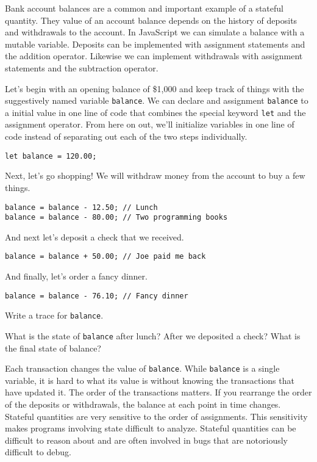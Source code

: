 Bank account balances are a common and important example of a stateful quantity. They value of an account balance depends on the history of deposits and withdrawals to the account. In JavaScript we can simulate a balance with a mutable variable. Deposits can be implemented with assignment statements and the addition operator. Likewise we can implement withdrawals with assignment statements and the subtraction operator.

Let's begin with an opening balance of \$1,000 and keep track of things with the suggestively named variable \texttt{balance}. We can declare and assignment \texttt{balance} to a initial value in one line of code that combines the special keyword \texttt{let} and the assignment operator. From here on out, we'll initialize variables in one line of code instead of separating out each of the two steps individually.

\begin{lstlisting}
let balance = 120.00;
\end{lstlisting}

Next, let's go shopping! We will withdraw money from the account to buy a few things.

\begin{lstlisting}
balance = balance - 12.50; // Lunch
balance = balance - 80.00; // Two programming books
\end{lstlisting}

And next let's deposit a check that we received.

\begin{lstlisting}
balance = balance + 50.00; // Joe paid me back
\end{lstlisting}

And finally, let's order a fancy dinner.

\begin{lstlisting}
balance = balance - 76.10; // Fancy dinner
\end{lstlisting}

\begin{question}
  Write a trace for \texttt{balance}.
\end{question}


\begin{question}
  What is the state of \texttt{balance} after lunch? After we deposited a check? What is the final state of balance?
\end{question}

Each transaction changes the value of \texttt{balance}. While \texttt{balance} is a single variable, it is hard to what its value is without knowing the transactions that have updated it. The order of the transactions matters. If you rearrange the order of the deposits or withdrawals, the balance at each point in time changes. Stateful quantities are very sensitive to the order of assignments. This sensitivity makes programs involving state difficult to analyze. Stateful quantities can be difficult to reason about and are often involved in bugs that are notoriously difficult to debug.

